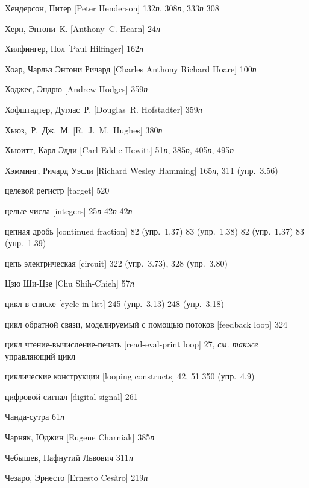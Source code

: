 \begin{theindex}
\item {Хендерсон, Питер [Peter Henderson]} 132{\it п}, 308{\it п}, 333{\it п}
   308
\item {Херн, Энтони~К. [Anthony~C. Hearn]} 24{\it п}
\item {Хилфингер, Пол [Paul Hilfinger]} 162{\it п}
\item {Хоар, Чарльз Энтони Ричард [Charles Anthony Richard Hoare]} 100{\it п}
\item {Ходжес, Эндрю [Andrew Hodges]} 359{\it п}
\item {Хофштадтер, Дуглас~Р. [Douglas~R. Hofstadter]} 359{\it п}
\item {Хьюз,~Р.~Дж.~М. [R.~J.~M.~Hughes]} 380{\it п}
\item {Хьюитт, Карл Эдди [Carl Eddie Hewitt]} 51{\it п}, 385{\it п}, 405{\it п}, 495{\it п}
\item {Хэмминг, Ричард Уэсли [Richard Wesley Hamming]} 165{\it п}, 311 (упр.~3.56)
\bigskip
\item {целевой регистр [target]} 520
\item {целые числа [integers]} 25{\it п}
   42{\it п}
   42{\it п}
\item {цепная дробь [continued fraction]} 82 (упр.~1.37)
   83 (упр.~1.38)
   82 (упр.~1.37)
   83 (упр.~1.39)
\item {цепь электрическая [circuit]}
   322 (упр.~3.73), 328 (упр.~3.80)
\item {Цзю Ши-Цзе [Chu Shih-Chieh]} 57{\it п}
\item {цикл в списке [cycle in list]} 245 (упр.~3.13)
   248 (упр.~3.18)
\item {цикл обратной связи, моделируемый с помощью потоков [feedback loop]} 324
\item {цикл чтение-вычисление-печать [read-eval-print loop]} 27, {\it см. также} управляющий цикл
\item {циклические конструкции [looping constructs]} 42, 51
   350 (упр.~4.9)
\item {цифровой сигнал [digital signal]} 261
\bigskip
\item {Чанда-сутра} 61{\it п}
\item {Чарняк, Юджин [Eugene Charniak]} 385{\it п}
\item {Чебышев, Пафнутий Львович} 311{\it п}
\item {Чезаро, Эрнесто [Ernesto Ces\`aro]} 219{\it п}

\end{theindex}
